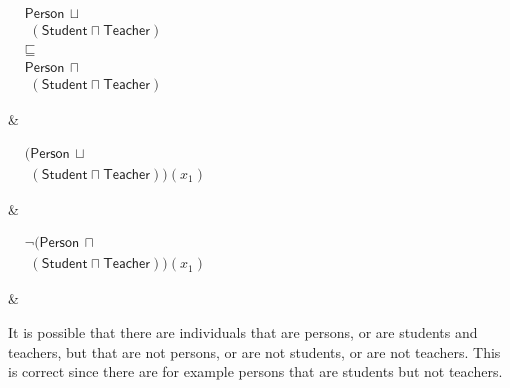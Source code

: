 \documentclass{amsart}
\newcommand\tableEntailmentSpacing{2.5cm}
\newcommand\tableExamplarSpacing{3.5cm}
\newcommand\tableCommentSpacing{4cm}
\newcommand\tableEquationIndent{4pt}
\begin{document}
\begin{table}
\begin{center}
\begin{tabular}
        \hline
         \begin{minipage}{\tableEntailmentSpacing}
        \vspace{2pt}
            $\begin{aligned}
               &\mathsf{Person} \hspace{2pt} \sqcup\\
              &\hspace{\tableEquationIndent}(\mathsf{Student} \sqcap \mathsf{Teacher}) \\
  	      &\sqsubseteq\\
  	      &\mathsf{Person} \hspace{2pt} \sqcap\\
  	      &\hspace{\tableEquationIndent}(\mathsf{Student} \sqcap \mathsf{Teacher})
           \end{aligned}$
  	\end{minipage}
        &
        \begin{minipage}{\tableExamplarSpacing}
  	    $\begin{aligned}
               &(\mathsf{Person} \hspace{2pt} \sqcup\\
              &\hspace{\tableEquationIndent}(\mathsf{Student} \sqcap \mathsf{Teacher}) )(x_1)
  	    \end{aligned}$
  	\end{minipage}
  	&
  	\begin{minipage}{\tableExamplarSpacing}
  	    \vspace{2pt}
  	   $\begin{aligned}
             &\neg(\mathsf{Person} \hspace{2pt} \sqcap\\
  	      &\hspace{\tableEquationIndent}(\mathsf{Student} \sqcap \mathsf{Teacher}))(x_1)
  	    \end{aligned}$ 
  	\end{minipage}
        &
        \begin{minipage}{\tableCommentSpacing}
            \vspace{2pt}
            It is possible that there are individuals that are persons, or are students and teachers, but that are not persons, or are not students, or are not teachers. This is correct since there are for example persons that are students but not teachers.
            \vspace{2pt}

\end{minipage}
\end{tabular}
\end{center}
\end{table}
\end{document}

